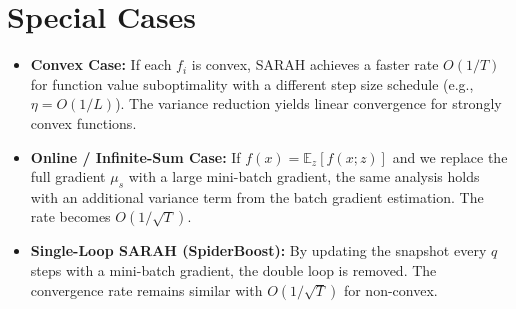 \documentclass{article}
\newcommand{\E}{\mathbb{E}}
\begin{document}
\section*{Special Cases}

\begin{itemize}
    \item \textbf{Convex Case:} If each $f_i$ is convex, SARAH achieves a faster rate $O(1/T)$ for function value suboptimality with a different step size schedule (e.g., $\eta = O(1/L)$). The variance reduction yields linear convergence for strongly convex functions.
    \item \textbf{Online / Infinite-Sum Case:} If $f(x) = \E_z[f(x;z)]$ and we replace the full gradient $\mu_s$ with a large mini-batch gradient, the same analysis holds with an additional variance term from the batch gradient estimation. The rate becomes $O(1/\sqrt{T})$.
    \item \textbf{Single-Loop SARAH (SpiderBoost):} By updating the snapshot every $q$ steps with a mini-batch gradient, the double loop is removed. The convergence rate remains similar with $O(1/\sqrt{T})$ for non-convex.
\end{itemize}
\end{document}
